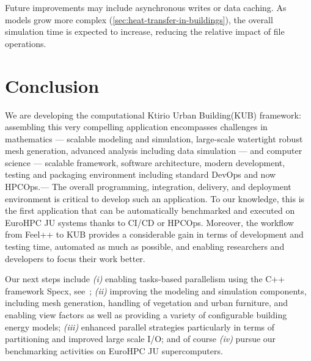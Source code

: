 \documentclass[runningheads]{llncs}
\begin{document}
Future improvements may include asynchronous writes or data caching. As models grow more complex (\cref{sec:heat-transfer-in-buildings}), the overall simulation time is expected to increase, reducing the relative impact of file operations.
\section{Conclusion}
\label{sec:conclusion}

We are developing the computational Ktirio Urban Building(KUB) framework: assembling this very compelling application encompasses challenges in mathematics --- scalable modeling and simulation, large-scale watertight robust mesh generation, advanced analysis including data simulation --- and computer science --- scalable framework, software architecture, modern development, testing and packaging environment including standard DevOps and now HPCOps.---
The overall programming, integration, delivery, and deployment environment is critical to develop such an application. To our knowledge, this is the first application that can be automatically benchmarked and executed on EuroHPC JU systems thanks to CI/CD or HPCOps. Moreover, the workflow from Feel++ to KUB provides a considerable gain in terms of development and testing time, automated as much as possible, and enabling researchers and developers to focus their work better.

Our next steps include \textit{(i)} enabling tasks-based parallelism using the C++ framework Specx, see~\cite{cardosi_specx_2022}; \textit{(ii)} improving the modeling and simulation components, including mesh generation, handling of vegetation and urban furniture, and enabling view factors as well as providing a variety of configurable building energy models; \textit{(iii)} enhanced parallel strategies particularly in terms of partitioning and improved large scale I/O; and of course \textit{(iv)} pursue our benchmarking activities on EuroHPC JU supercomputers.
\end{document}

